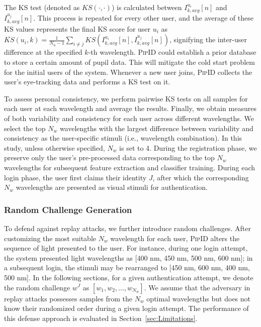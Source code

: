 \documentclass[sigconf]{acmart}
\newcommand{\sysname}{\textsc{PipID}\xspace}
\begin{document}
The KS test (denoted as $KS(\cdot, \cdot)$) is calculated between $I_{k,avg}^{u_i}[n]$ and $I_{k,avg}^{u_j}[n]$. This process is repeated for every other user, and the average of these KS values represents the final KS score for user $u_i$ as $\overline{KS}(u_i, k) = \frac{1}{N_u-1}\sum_{i\neq j}{KS(I_{k,avg}^{u_i}[n], I_{k,avg}^{u_j}[n])}$, signifying the inter-user difference at the specified $k$-th wavelength. \sysname could establish a prior database to store a certain amount of pupil data. This will mitigate the cold start problem for the initial users of the system. Whenever a new user joins, \sysname collects the user's eye-tracking data and performs a KS test on it.

To assess personal consistency, we perform pairwise KS tests on all samples for each user at each wavelength and average the results. Finally, we obtain measures of both variability and consistency for each user across different wavelengths. We select the top $N_w$ wavelengths  with the largest difference between variability and consistency as the user-specific stimuli (i.e., wavelength combination). In this study, unless otherwise specified, $N_w$ is set to 4. During the registration phase, we preserve only the user's pre-processed data corresponding to the top $N_w$ wavelengths for subsequent feature extraction and classifier training. During each login phase, the user first claims their identity $J$, after which the corresponding $N_w$ wavelengths are presented as visual stimuli for authentication.

\subsubsection{Random Challenge Generation}\label{sec:random:challenge}
To defend against replay attacks, we further introduce random challenges. After customizing the most suitable $N_w$ wavelength for each user, \sysname alters the sequence of light presented to the user. For instance, during one login attempt, the system presented light wavelengths as [400 nm, 450 nm, 500 nm, 600 nm]; in a subsequent login, the stimuli may be rearranged to [450 nm, 600 nm, 400 nm, 500 nm]. In the following sections, for a given authentication attempt, we denote the random challenge $w^J$ as $[w_1, w_2, \dots, w_{N_w}]$. We assume that the adversary in replay attacks possesses samples from the $N_w$ optimal wavelengths but does not know their randomized order during a given login attempt. The performance of this defense approach is evaluated in Section~\ref{sec:Limitations}.
\end{document}
